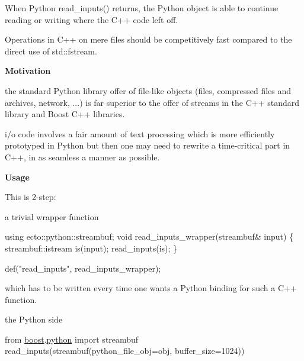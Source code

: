 \begin{DoxyItemize}
\item When Python {\ttfamily read\+\_\+inputs()} returns, the Python object is able to continue reading or writing where the C++ code left off.
\item Operations in C++ on mere files should be competitively fast compared to the direct use of {\ttfamily std\+::fstream}.
\end{DoxyItemize}

{\bfseries Motivation} 


\begin{DoxyItemize}
\item the standard Python library offer of file-\/like objects (files, compressed files and archives, network, ...) is far superior to the offer of streams in the C++ standard library and Boost C++ libraries.
\item i/o code involves a fair amount of text processing which is more efficiently prototyped in Python but then one may need to rewrite a time-\/critical part in C++, in as seamless a manner as possible.
\end{DoxyItemize}

{\bfseries Usage} 

This is 2-\/step\+:


\begin{DoxyItemize}
\item a trivial wrapper function
\end{DoxyItemize}


\begin{DoxyCode}
\textcolor{keyword}{using} ecto::python::streambuf;
\textcolor{keywordtype}{void} read\_inputs\_wrapper(streambuf& input)
\{
  streambuf::istream is(input);
  read\_inputs(is);
\}

def(\textcolor{stringliteral}{"read\_inputs"}, read\_inputs\_wrapper);
\end{DoxyCode}


which has to be written every time one wants a Python binding for such a C++ function.


\begin{DoxyItemize}
\item the Python side
\end{DoxyItemize}


\begin{DoxyCode}
from \hyperlink{namespaceboost}{boost}.\hyperlink{namespaceboost_1_1python}{python} \textcolor{keyword}{import} streambuf
read\_inputs(streambuf(python\_file\_obj=obj, buffer\_size=1024))
\end{DoxyCode}


